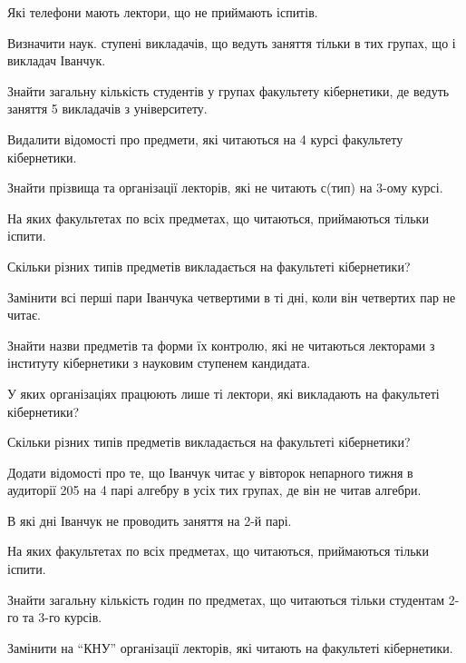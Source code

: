 \begin{card}
    \item Які телефони мають лектори, що не приймають іспитів.
    \item Визначити наук. ступені викладачів, що ведуть заняття тільки в тих групах, що і викладач Іванчук.
    \item Знайти загальну кількість студентів у групах факультету кібернетики, де ведуть заняття 5 викладачів з університету.
    \item Видалити відомості про предмети, які читаються на 4 курсі факультету кібернетики.
\end{card}

\begin{card}
    \item Знайти прізвища та організації лекторів, які не читають с (тип) на 3-ому курсі.
    \item На яких факультетах по всіх предметах, що читаються, приймаються тільки іспити.
    \item Скільки різних типів предметів викладається на факультеті кібернетики?
    \item Замінити всі перші пари Іванчука четвертими в ті дні, коли він четвертих пар не читає.
\end{card}

\begin{card}
    \item Знайти назви предметів та форми їх контролю, які не читаються лекторами з інституту кібернетики з науковим ступенем кандидата.
    \item У яких організаціях працюють лише ті лектори, які викладають на факультеті кібернетики?
    \item Скільки різних типів предметів викладається на факультеті кібернетики?
    \item Додати відомості про те, що Іванчук читає у вівторок непарного тижня в аудиторії 205 на 4 парі алгебру в усіх тих групах, де він не читав алгебри.
\end{card}

\begin{card}
    \item В які дні Іванчук не проводить заняття на 2-й парі.
    \item На яких факультетах по всіх предметах, що читаються, приймаються тільки іспити.
    \item Знайти загальну кількість годин по предметах, що читаються тільки студентам 2-го та 3-го курсів.
    \item Замінити на ``КНУ'' організації лекторів, які читають на факультеті кібернетики.
\end{card}
